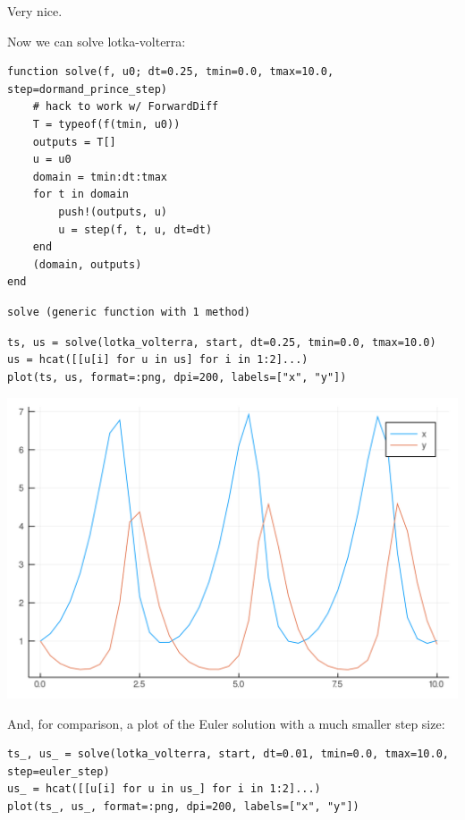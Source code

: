 \documentclass[nobib]{tufte-handout}
\begin{document}
Very nice.

Now we can solve lotka-volterra:

\begin{verbatim}
function solve(f, u0; dt=0.25, tmin=0.0, tmax=10.0, step=dormand_prince_step)
    # hack to work w/ ForwardDiff
    T = typeof(f(tmin, u0))
    outputs = T[]
    u = u0
    domain = tmin:dt:tmax
    for t in domain
        push!(outputs, u)
        u = step(f, t, u, dt=dt)
    end
    (domain, outputs)
end
\end{verbatim}

\begin{verbatim}
solve (generic function with 1 method)
\end{verbatim}


\begin{verbatim}
ts, us = solve(lotka_volterra, start, dt=0.25, tmin=0.0, tmax=10.0)
us = hcat([[u[i] for u in us] for i in 1:2]...)
plot(ts, us, format=:png, dpi=200, labels=["x", "y"])
\end{verbatim}

\begin{center}
\includegraphics[width=.9\linewidth]{./.ob-jupyter/b27be8bcde0ff347ce1871cc1ed5426c5cf57422.png}
\end{center}


And, for comparison, a plot of the Euler solution with a much smaller step
size:
\begin{verbatim}
ts_, us_ = solve(lotka_volterra, start, dt=0.01, tmin=0.0, tmax=10.0, step=euler_step)
us_ = hcat([[u[i] for u in us_] for i in 1:2]...)
plot(ts_, us_, format=:png, dpi=200, labels=["x", "y"])
\end{verbatim}
\end{document}

